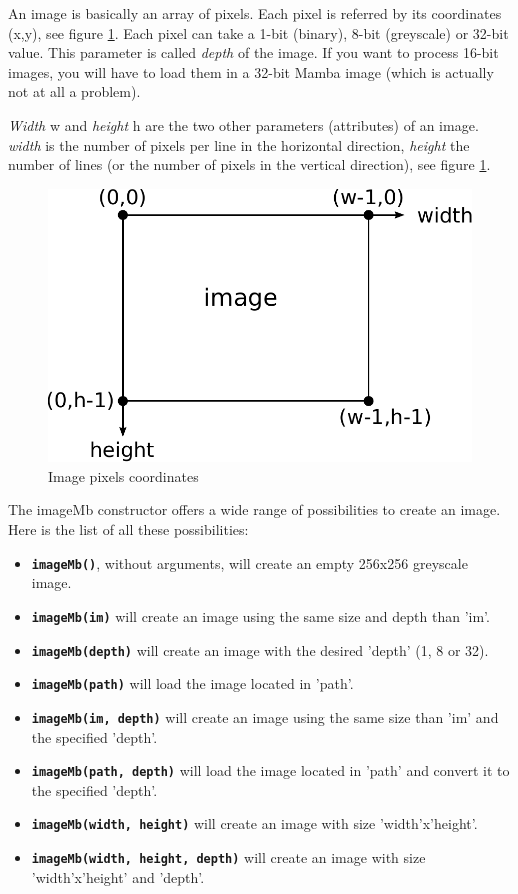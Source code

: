 \documentclass[a4paper,10pt,oneside]{article}
\begin{document}
An image is basically an array of pixels. Each pixel is referred by its coordinates (x,y), see
figure \ref{fig:image_coord}. Each pixel can take a 1-bit (binary), 8-bit (greyscale) or 32-bit value.
This parameter is called \textit{depth} of the image. If you want to process 16-bit images, you will have to
load them in a 32-bit Mamba image (which is actually not at all a problem).

\textit{Width} w and \textit{height} h are the two other parameters (attributes)
of an image. \textit{width} is the number of pixels per line in the horizontal
direction, \textit{height} the number of lines (or the number of pixels in
the vertical direction), see figure \ref{fig:image_coord}.

\begin{figure}
\centering
\includegraphics[scale=0.7]{figures/image_coord.pdf}
\caption{Image pixels coordinates}
\label{fig:image_coord}
\end{figure}

The imageMb constructor offers a wide range of possibilities to create an image. 
Here is the list of all these possibilities:

\begin{itemize}
\item \texttt{\textbf{imageMb()}}, without arguments, will create an empty 
256x256 greyscale image.
\item \texttt{\textbf{imageMb(im)}} will create an image using the same size 
and depth than 'im'.
\item \texttt{\textbf{imageMb(depth)}} will create an image with the desired
'depth' (1, 8 or 32).
\item \texttt{\textbf{imageMb(path)}} will load the image located in 'path'.
\item \texttt{\textbf{imageMb(im, depth)}} will create an image using the same 
size than 'im' and the specified 'depth'.
\item \texttt{\textbf{imageMb(path, depth)}} will load the image located in 
'path' and convert it to the specified 'depth'.
\item \texttt{\textbf{imageMb(width, height)}} will create an image with size 
'width'x'height'.
\item \texttt{\textbf{imageMb(width, height, depth)}} will create an image with
size 'width'x'height' and 'depth'.
\end{itemize}
\end{document}
